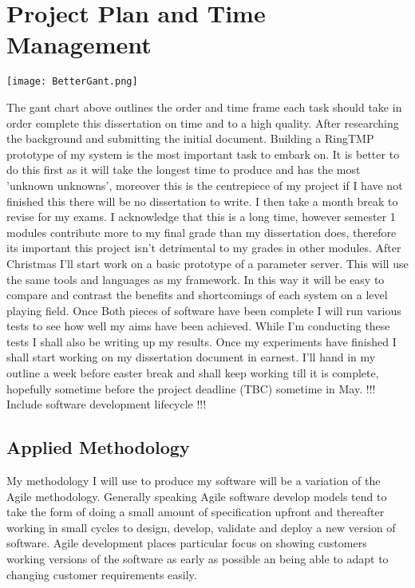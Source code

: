 \clearpage
\section{Project Plan and Time Management}

\texttt{[image: BetterGant.png]}

The gant chart above outlines the order and time frame each task should take in
order complete this dissertation on time and to a high quality. After
researching the background and submitting the initial document. Building a
RingTMP prototype of my system is the most important task to embark on. It is
better to do this first as it will take the longest time to produce and has the
most 'unknown unknowns', moreover this is the centrepiece of my project if I
have not finished this there will be no dissertation to write. I then take a
month break to revise for my exams. I acknowledge that this is a long time,
however semester 1 modules contribute more to my final grade than my
dissertation does, therefore its important this project isn't detrimental to my
grades in other modules. After Christmas I'll start work on a basic prototype of
a parameter server. This will use the same tools and languages as my framework.
In this way it will be easy to compare and contrast the benefits and
shortcomings of each system on a level playing field. Once Both pieces of
software have been complete I will run various tests to see how well my aims
have been achieved. While I'm conducting these tests I shall also be writing up
my results. Once my experiments have finished I shall start working on my
dissertation document in earnest. I'll hand in my outline a week before easter
break and shall keep working till it is complete, hopefully sometime before the
project deadline (TBC) sometime in May.
\newline
!!! Include software development lifecycle !!!

\subsection{Applied Methodology}

My methodology I will use to produce my software will be a variation of the
Agile methodology. Generally speaking Agile software develop models tend to take
the form of doing a small amount of specification upfront and thereafter working
in small cycles to design, develop, validate and deploy a new version of
software. Agile development places particular focus on showing customers working
versions of the software as early as possible an being able to adapt to changing
customer requirements easily. \cite{fowler2001agile}

